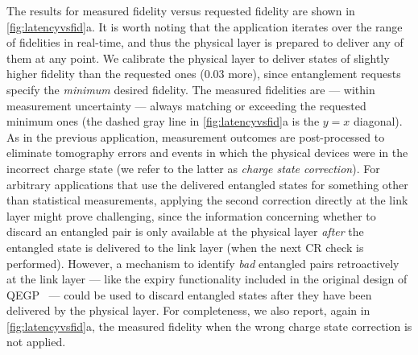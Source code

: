 The results for measured fidelity versus requested fidelity are shown in \cref{fig:latencyvsfid}a.
It is worth noting that the application iterates over the range of fidelities in real-time, and thus
the physical layer is prepared to deliver any of them at any point. We calibrate the physical layer
to deliver states of slightly higher fidelity than the requested ones (\num{0.03} more), since
entanglement requests specify the \emph{minimum} desired fidelity. The measured fidelities are ---
within measurement uncertainty --- always matching or exceeding the requested minimum ones (the
dashed gray line in \cref{fig:latencyvsfid}a is the $y=x$ diagonal). As in the previous application,
measurement outcomes are post-processed to eliminate tomography errors and events in which the
physical devices were in the incorrect charge state (we refer to the latter as \emph{charge state
correction}). For arbitrary applications that use the delivered entangled states for something other
than statistical measurements, applying the second correction directly at the link layer might prove
challenging, since the information concerning whether to discard an entangled pair is only available
at the physical layer \emph{after} the entangled state is delivered to the link layer (when the next
CR check is performed). However, a mechanism to identify \emph{bad} entangled pairs retroactively at
the link layer --- like the expiry functionality included in the original design of
QEGP~\cite{dahlberg_2019_egp} --- could be used to discard entangled states after they have been
delivered by the physical layer. For completeness, we also report, again in
\cref{fig:latencyvsfid}a, the measured fidelity when the wrong charge state correction is not
applied.

